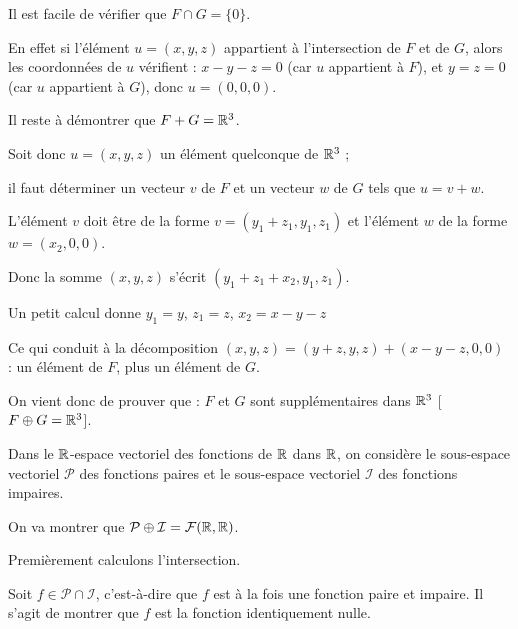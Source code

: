 \change

Il est facile de vérifier que  $F\cap G=\{0\}$. 

\change

En effet si l'élément  $u=(x,y,z)$ appartient à l'intersection de $F$ et de $G$, 
alors les coordonnées de $u$ vérifient :  $x-y-z=0$ (car $u$ appartient à $F$), 
et  $y=z=0$ (car $u$ appartient à $G$), donc  $u=(0,0,0)$.
  
\change

Il reste à démontrer que $F+G=\mathbb{R}^3$.

\change


  Soit donc  $u=(x,y,z)$ un élément quelconque de $\mathbb{R}^3$ ;
  
  \change
  
  il faut déterminer un vecteur $v$ de $F$ et un vecteur $w$ de $G$ tels que $u=v+w$.
  
  \change
  
L'élément $v$ doit être de la forme $v=(y_1+z_1, y_1,z_1)$  et l'élément $w$ de la forme
  $w=(x_2,0,0)$. 
  
  \change
  
Donc la somme $(x,y,z)$ s'écrit $(y_1+z_1+x_2,y_1,z_1)$.

Un petit calcul donne  $y_1=y$, $z_1=z$, $x_2=x-y-z$


\change

Ce qui conduit à la décomposition $(x,y,z)=(y+z,y,z)+ (x-y-z, 0,0)$ : un élément de $F$, plus un élément de $G$.

\change

On vient donc de prouver que : $F$ et $G$ sont supplémentaires dans $\mathbb{R}^3$ [$F \oplus G=\mathbb{R}^3$].


\diapo


Dans le $\mathbb{R}$-espace vectoriel 
des fonctions de $\mathbb{R}$ dans $\mathbb{R}$, on considère le sous-espace 
vectoriel $\mathcal{P}$ des fonctions paires et le sous-espace 
vectoriel $\mathcal{I}$ des fonctions impaires. 

On va montrer que 
$\mathcal{P}\oplus\mathcal{I}=\mathcal{F}(\mathbb{R},\mathbb{R})$. 

\change

Premièrement calculons l'intersection.

\change

  Soit $f \in \mathcal{P} \cap \mathcal{I}$, c'est-à-dire que $f$ est à la 
  fois une fonction paire et impaire.
  Il s'agit de montrer que $f$ est la fonction identiquement nulle.
  
